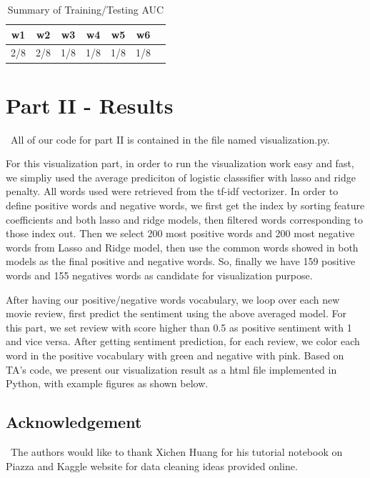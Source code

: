 \documentclass[12pt]{article}
\begin{document}
\begin{table}[htb]
 \caption{Summary of Training/Testing AUC} \label{result}
\begin{center}
  \begin{tabular}{  c  c  c  c  c  c  c}
    \hline
    w1 & w2 & w3 & w4 & w5 & w6 \\ \hline
    2/8 & 2/8 & 1/8 & 1/8 & 1/8 & 1/8\\ \hline
  \end{tabular}
\end{center}
\end{table}

\balance
\section{Part II - Results}

\quad\ All of our code for part II is contained in the file named visualization.py. 

For this visualization part, in order to run the visualization work easy and fast, we simpliy used the average prediciton of logistic classsifier with lasso and ridge penalty. All words used were retrieved from the tf-idf vectorizer.  In order to define positive words and negative words, we first get the index by sorting feature coefficients and both lasso and ridge models, then filtered words corresponding to those index out. Then we select 200 most positive words and 200 most negative words from Lasso and Ridge model, then use the common words showed in both models as the final positive and negative words. So, finally we have 159 positive words and 155 negatives words as candidate for visualization purpose.

After having our positive/negative words vocabulary, we loop over each new movie review, first predict the sentiment using the above averaged model. For this part, we set review with score higher than 0.5 as positive sentiment with 1 and vice versa. After getting sentiment prediction, for each review, we color each word in the positive vocabulary with green and negative with pink. Based on TA's code, we present our visualization result as a html file implemented in Python, with example figures as shown below.
 
\subsection*{Acknowledgement}
\quad\ The authors would like to thank Xichen Huang for his tutorial notebook on Piazza and Kaggle website for data cleaning ideas provided online.
\end{document}
